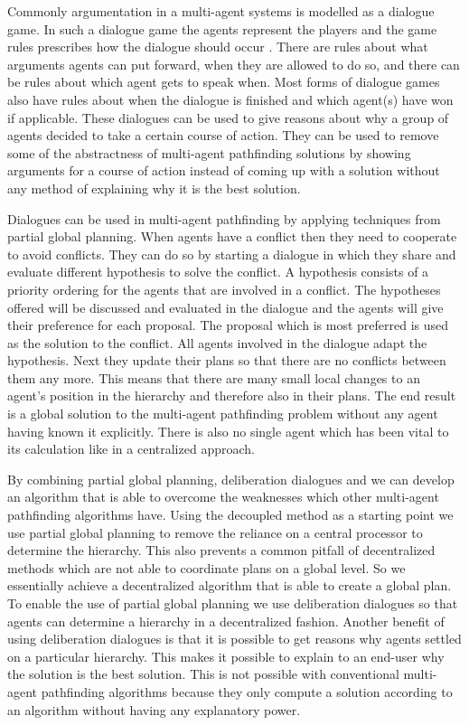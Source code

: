Commonly argumentation in a multi-agent systems is modelled as a dialogue game.
In such a dialogue game the agents represent the players and the game rules
prescribes how the dialogue should occur \cite{walton1995}. There are rules
about what arguments agents can put forward, when they are allowed to do so,
and there can be rules about which agent gets to speak when. Most forms of
dialogue games also have rules about when the dialogue is finished and which
agent(s) have won if applicable. These dialogues can be used to give reasons
about why a group of agents decided to take a certain course of action. They
can be used to remove some of the abstractness of multi-agent pathfinding
solutions by showing arguments for a course of action instead of coming up with
a solution without any method of explaining why it is the best solution.

Dialogues can be used in multi-agent pathfinding by applying techniques from
partial global planning. When agents have a conflict then they need to
cooperate to avoid conflicts. They can do so by starting a dialogue in which
they share and evaluate different hypothesis to solve the conflict. A
hypothesis consists of a priority ordering for the agents that are involved in
a conflict. The hypotheses offered will be discussed and evaluated in the
dialogue and the agents will give their preference for each proposal. The
proposal which is most preferred is used as the solution to the conflict. All
agents involved in the dialogue adapt the hypothesis. Next they update their
plans so that there are no conflicts between them any more. This means that
there are many small local changes to an agent's position in the hierarchy and
therefore also in their plans. The end result is a global solution to the
multi-agent pathfinding problem without any agent having known it explicitly.
There is also no single agent which has been vital to its calculation like in a
centralized approach.

By combining partial global planning, deliberation dialogues and we can develop
an algorithm that is able to overcome the weaknesses which other multi-agent
pathfinding algorithms have. Using the decoupled method as a starting point we
use partial global planning to remove the reliance on a central processor to
determine the hierarchy. This also prevents a common pitfall of decentralized
methods which are not able to coordinate plans on a global level. So we
essentially achieve a decentralized algorithm that is able to create a global
plan. To enable the use of partial global planning we use deliberation
dialogues so that agents can determine a hierarchy in a decentralized fashion.
Another benefit of using deliberation dialogues is that it is possible to get
reasons why agents settled on a particular hierarchy. This makes it possible to
explain to an end-user why the solution is the best solution. This is not
possible with conventional multi-agent pathfinding algorithms because they only
compute a solution according to an algorithm without having any explanatory
power.

